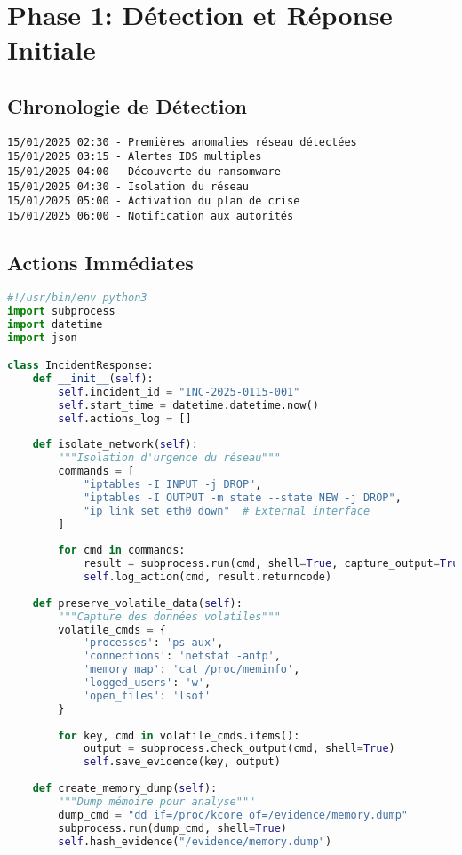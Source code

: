 \section{Phase 1: Détection et Réponse Initiale}
\subsection{Chronologie de Détection}
\begin{verbatim}
15/01/2025 02:30 - Premières anomalies réseau détectées
15/01/2025 03:15 - Alertes IDS multiples
15/01/2025 04:00 - Découverte du ransomware
15/01/2025 04:30 - Isolation du réseau
15/01/2025 05:00 - Activation du plan de crise
15/01/2025 06:00 - Notification aux autorités
\end{verbatim}

\subsection{Actions Immédiates}
\begin{lstlisting}[language=Python, caption=Script de réponse d'urgence exécuté]
#!/usr/bin/env python3
import subprocess
import datetime
import json

class IncidentResponse:
    def __init__(self):
        self.incident_id = "INC-2025-0115-001"
        self.start_time = datetime.datetime.now()
        self.actions_log = []
    
    def isolate_network(self):
        """Isolation d'urgence du réseau"""
        commands = [
            "iptables -I INPUT -j DROP",
            "iptables -I OUTPUT -m state --state NEW -j DROP",
            "ip link set eth0 down"  # External interface
        ]
        
        for cmd in commands:
            result = subprocess.run(cmd, shell=True, capture_output=True)
            self.log_action(cmd, result.returncode)
    
    def preserve_volatile_data(self):
        """Capture des données volatiles"""
        volatile_cmds = {
            'processes': 'ps aux',
            'connections': 'netstat -antp',
            'memory_map': 'cat /proc/meminfo',
            'logged_users': 'w',
            'open_files': 'lsof'
        }
        
        for key, cmd in volatile_cmds.items():
            output = subprocess.check_output(cmd, shell=True)
            self.save_evidence(key, output)
    
    def create_memory_dump(self):
        """Dump mémoire pour analyse"""
        dump_cmd = "dd if=/proc/kcore of=/evidence/memory.dump"
        subprocess.run(dump_cmd, shell=True)
        self.hash_evidence("/evidence/memory.dump")
\end{lstlisting}

